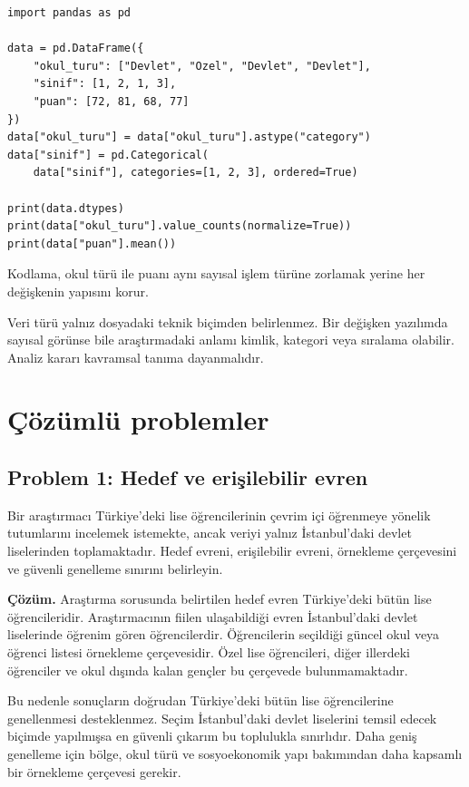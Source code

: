\begin{softwarebox}
\begin{lstlisting}
import pandas as pd

data = pd.DataFrame({
    "okul_turu": ["Devlet", "Ozel", "Devlet", "Devlet"],
    "sinif": [1, 2, 1, 3],
    "puan": [72, 81, 68, 77]
})
data["okul_turu"] = data["okul_turu"].astype("category")
data["sinif"] = pd.Categorical(
    data["sinif"], categories=[1, 2, 3], ordered=True)

print(data.dtypes)
print(data["okul_turu"].value_counts(normalize=True))
print(data["puan"].mean())
\end{lstlisting}
Kodlama, okul türü ile puanı aynı sayısal işlem türüne zorlamak yerine her
değişkenin yapısını korur.
\end{softwarebox}

\begin{assumptionbox}
Veri türü yalnız dosyadaki teknik biçimden belirlenmez. Bir değişken yazılımda
sayısal görünse bile araştırmadaki anlamı kimlik, kategori veya sıralama
olabilir. Analiz kararı kavramsal tanıma dayanmalıdır.
\end{assumptionbox}

\section{Çözümlü problemler}

\subsection*{Problem 1: Hedef ve erişilebilir evren}

Bir araştırmacı Türkiye'deki lise öğrencilerinin çevrim içi öğrenmeye yönelik
tutumlarını incelemek istemekte, ancak veriyi yalnız İstanbul'daki devlet
liselerinden toplamaktadır. Hedef evreni, erişilebilir evreni, örnekleme
çerçevesini ve güvenli genelleme sınırını belirleyin.

\textbf{Çözüm.} Araştırma sorusunda belirtilen hedef evren Türkiye'deki bütün
lise öğrencileridir. Araştırmacının fiilen ulaşabildiği evren İstanbul'daki
devlet liselerinde öğrenim gören öğrencilerdir. Öğrencilerin seçildiği güncel
okul veya öğrenci listesi örnekleme çerçevesidir. Özel lise öğrencileri,
diğer illerdeki öğrenciler ve okul dışında kalan gençler bu çerçevede
bulunmamaktadır.

Bu nedenle sonuçların doğrudan Türkiye'deki bütün lise öğrencilerine
genellenmesi desteklenmez. Seçim İstanbul'daki devlet liselerini temsil edecek
biçimde yapılmışsa en güvenli çıkarım bu toplulukla sınırlıdır. Daha geniş
genelleme için bölge, okul türü ve sosyoekonomik yapı bakımından daha kapsamlı
bir örnekleme çerçevesi gerekir.

